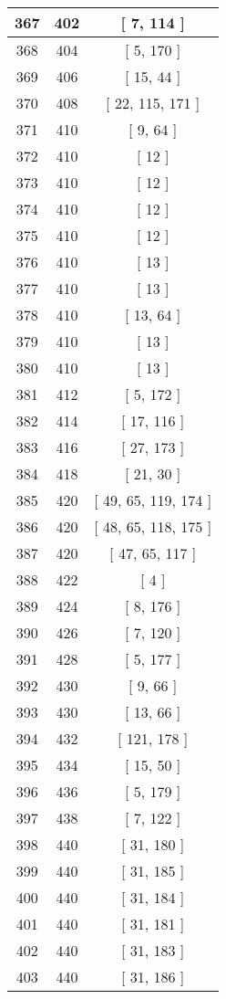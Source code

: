 \begin{center}
\begin{longtable}[H]{|| c c c ||}
367 & 402 & [ 7, 114 ]
\\\hline
368 & 404 & [ 5, 170 ]
\\\hline
369 & 406 & [ 15, 44 ]
\\\hline
370 & 408 & [ 22, 115, 171 ]
\\\hline
371 & 410 & [ 9, 64 ]
\\\hline
372 & 410 & [ 12 ]
\\\hline
373 & 410 & [ 12 ]
\\\hline
374 & 410 & [ 12 ]
\\\hline
375 & 410 & [ 12 ]
\\\hline
376 & 410 & [ 13 ]
\\\hline
377 & 410 & [ 13 ]
\\\hline
378 & 410 & [ 13, 64 ]
\\\hline
379 & 410 & [ 13 ]
\\\hline
380 & 410 & [ 13 ]
\\\hline
381 & 412 & [ 5, 172 ]
\\\hline
382 & 414 & [ 17, 116 ]
\\\hline
383 & 416 & [ 27, 173 ]
\\\hline
384 & 418 & [ 21, 30 ]
\\\hline
385 & 420 & [ 49, 65, 119, 174 ]
\\\hline
386 & 420 & [ 48, 65, 118, 175 ]
\\\hline
387 & 420 & [ 47, 65, 117 ]
\\\hline
388 & 422 & [ 4 ]
\\\hline
389 & 424 & [ 8, 176 ]
\\\hline
390 & 426 & [ 7, 120 ]
\\\hline
391 & 428 & [ 5, 177 ]
\\\hline
392 & 430 & [ 9, 66 ]
\\\hline
393 & 430 & [ 13, 66 ]
\\\hline
394 & 432 & [ 121, 178 ]
\\\hline
395 & 434 & [ 15, 50 ]
\\\hline
396 & 436 & [ 5, 179 ]
\\\hline
397 & 438 & [ 7, 122 ]
\\\hline
398 & 440 & [ 31, 180 ]
\\\hline
399 & 440 & [ 31, 185 ]
\\\hline
400 & 440 & [ 31, 184 ]
\\\hline
401 & 440 & [ 31, 181 ]
\\\hline
402 & 440 & [ 31, 183 ]
\\\hline
403 & 440 & [ 31, 186 ]

\end{longtable}
\end{center}
